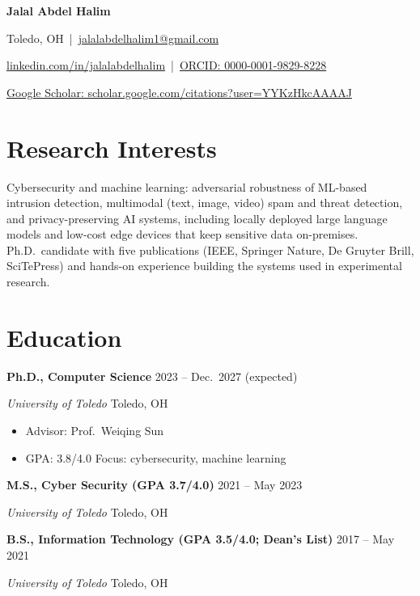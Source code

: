 \documentclass[11pt,letterpaper]{article}
\newcommand{\entry}[4]{%
  \textbf{#1} \hfill #2\par
  \textit{#3} \hfill #4\par\vspace{1pt}}
\begin{document}
\begin{center}
  {\LARGE\bfseries Jalal Abdel Halim}\par\vspace{4pt}
  Toledo, OH \,|\,
  \href{mailto:jalalabdelhalim1@gmail.com}{jalalabdelhalim1@gmail.com}\par
  \href{https://www.linkedin.com/in/jalalabdelhalim}{linkedin.com/in/jalalabdelhalim} \,|\,
  \href{https://orcid.org/0000-0001-9829-8228}{ORCID: 0000-0001-9829-8228}\par
  \href{https://scholar.google.com/citations?user=YYKzHkcAAAAJ}{Google Scholar: scholar.google.com/citations?user=YYKzHkcAAAAJ}

\end{center}

\section{Research Interests}
Cybersecurity and machine learning: adversarial robustness of ML-based intrusion
detection, multimodal (text, image, video) spam and threat detection, and
privacy-preserving AI systems, including locally deployed large language models
and low-cost edge devices that keep sensitive data on-premises. Ph.D.\ candidate
with five publications (IEEE, Springer Nature, De Gruyter Brill, SciTePress) and
hands-on experience building the systems used in experimental research.

\section{Education}
\entry{Ph.D., Computer Science}{2023 -- Dec.\ 2027 (expected)}
      {University of Toledo}{Toledo, OH}
\begin{itemize}
  \item Advisor: Prof.\ Weiqing Sun
  \item GPA: 3.8/4.0 \quad Focus: cybersecurity, machine learning
\end{itemize}
\vspace{3pt}
\entry{M.S., Cyber Security \textmd{(GPA 3.7/4.0)}}{2021 -- May 2023}
      {University of Toledo}{Toledo, OH}
\vspace{3pt}
\entry{B.S., Information Technology \textmd{(GPA 3.5/4.0; Dean's List)}}{2017 -- May 2021}
      {University of Toledo}{Toledo, OH}
\end{document}
